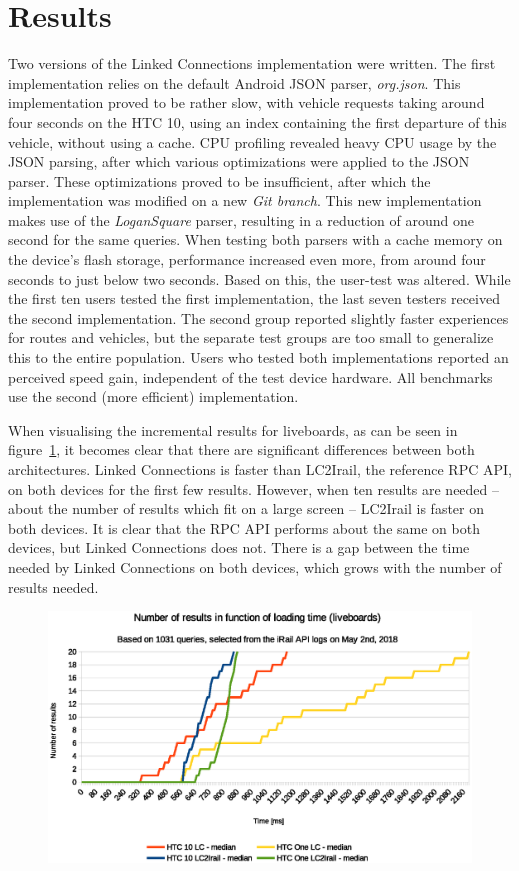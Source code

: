 \documentclass[twocolumn]{phdsymp} %
\begin{document}
\section{Results}

Two versions of the Linked Connections implementation were written. The first implementation relies on the default Android JSON parser, \emph{org.json}. This implementation proved to be rather slow, with vehicle requests taking around four seconds on the HTC 10, using an index containing the first departure of this vehicle, without using a cache. CPU profiling revealed heavy CPU usage by the JSON parsing, after which various optimizations were applied to the JSON parser. These optimizations proved to be insufficient, after which the implementation was modified on a new \emph{Git branch}. This new implementation makes use of the \emph{LoganSquare} parser, resulting in a reduction of around one second for the same queries. When testing both parsers with a cache memory on the device's flash storage, performance increased even more, from around four seconds to just below two seconds. Based on this, the user-test was altered. While the first ten users tested the first implementation, the last seven testers received the second implementation. The second group reported slightly faster experiences for routes and vehicles, but the separate test groups are too small to generalize this to the entire population. Users who tested both implementations reported an perceived speed gain, independent of the test device hardware. All benchmarks use the second (more efficient) implementation.

When visualising the incremental results for liveboards, as can be seen in figure~\ref{fig:liveboard}, it becomes clear that there are significant differences between both architectures. Linked Connections is faster than LC2Irail, the reference RPC API, on both devices for the first few results. However, when ten results are needed -- about the number of results which fit on a large screen -- LC2Irail is faster on both devices.
It is clear that the RPC API performs about the same on both devices, but Linked Connections does not. There is a gap between the time needed by Linked Connections on both devices, which grows with the number of results needed.

\begin{figure}[ht]
	\begin{center}
		\includegraphics[width=.50\textwidth]{images/dief_liveboards_average.eps}
		\caption{\label{fig:liveboard} }
	\end{center}
\end{figure}
\end{document}
